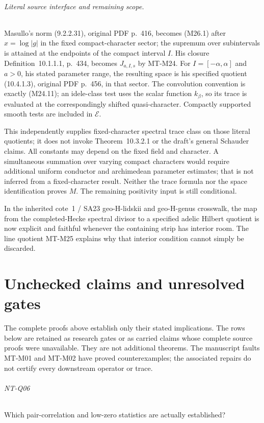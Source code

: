 \documentclass[11pt,a4paper]{article}
\begin{document}
\paragraph{Literal source interface and remaining scope.}
Masullo's norm (9.2.2.31), original PDF p.~416, becomes
(M26.1) after $x=\log|g|$ in the fixed compact-character
sector; the supremum over subintervals is attained at
the endpoints of the compact interval $I$. His closure
Definition~10.1.1.1, p.~434, becomes $J_{a,I,s}$ by
MT-M24. For $I=[-\alpha,\alpha]$ and $a>0$, his stated
parameter range, the resulting space
is his specified quotient (10.4.1.3), original PDF p.~456,
in that sector. The convolution convention is exactly
(M24.11); an idele-class test uses the scalar function
$k_\beta$, so its trace is evaluated at the correspondingly
shifted quasi-character. Compactly supported smooth tests
are included in $\mathcal E$.

This independently supplies fixed-character spectral
trace class on those literal quotients; it does not invoke
Theorem~10.3.2.1 or the draft's general Schauder claims.
All constants may depend on the fixed field and character.
A simultaneous summation over varying compact characters
would require additional uniform conductor and archimedean
parameter estimates; that is not inferred from a
fixed-character result. Neither the trace formula nor
the space identification proves $M$. The remaining
positivity input is still conditional.

In the inherited cote~1 / SA23 geo-H-lidskii and geo-H-genus
crosswalk, the map from the completed-Hecke spectral
divisor to a specified adelic Hilbert quotient is now
explicit and faithful whenever the containing strip has
interior room. The line quotient MT-M25 explains why
that interior condition cannot simply be discarded.

\part{Unchecked claims and unresolved gates}
The complete proofs above establish only their stated implications.
The rows below are retained as research gates or as carried claims whose
complete source proofs were unavailable. They are not additional theorems.
The manuscript faults MT-M01 and MT-M02 have proved counterexamples;
the associated repairs do not certify every downstream operator or trace.

\paragraph{NT-Q06} Which pair-correlation and low-zero statistics are actually established?
\end{document}
